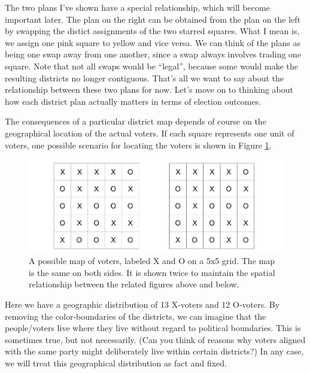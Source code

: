 \documentclass[
  openany]{book}
\begin{document}
The two plans I've shown have a special relationship, which will become important later. The plan on the right can be obtained from the plan on the left by swapping the distict assignments of the two starred squares. What I mean is, we assign one pink square to yellow and vice versa. We can think of the plans as being one swap away from one another, since a swap always involves trading one square. Note that not all swaps would be ``legal'', because some would make the resulting districts no longer contiguous. That's all we want to say about the relationship between these two plans for now. Let's move on to thinking about how each district plan actually matters in terms of election outcomes.

The consequences of a particular district map depends of course on the geographical location of the actual voters. If each square represents one unit of voters, one possible scenario for locating the voters is shown in Figure \ref{fig:gerrymandering-5x5-2}.

\begin{figure}

{\centering \includegraphics[width=0.8\linewidth]{images/gerrymandering5x5_2} 

}

\caption{A possible map of voters, labeled X and O on a 5x5 grid. The map is the same on both sides. It is shown twice to maintain the spatial relationship between the related figures above and below.}\label{fig:gerrymandering-5x5-2}
\end{figure}

Here we have a geographic distribution of 13 X-voters and 12 O-voters. By removing the color-boundaries of the districts, we can imagine that the people/voters live where they live without regard to political boundaries. This is sometimes true, but not necessarily. (Can you think of reasons why voters aligned with the same party might deliberately live within certain districts?) In any case, we will treat this geographical distribution as fact and fixed.
\end{document}
